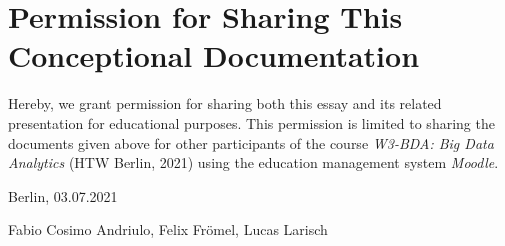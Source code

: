\section*{Permission for Sharing This Conceptional Documentation}

Hereby, we grant permission for sharing both this essay and its related presentation for educational purposes.
This permission is limited to sharing the documents given above for other participants of the course \textit{W3-BDA: Big Data Analytics} (HTW Berlin, 2021) using the education management system \textit{Moodle}.

\vspace{15mm}

{\setlength{\parindent}{0cm}
    Berlin, 03.07.2021

    Fabio Cosimo Andriulo,
    Felix Frömel,
    Lucas Larisch
}
